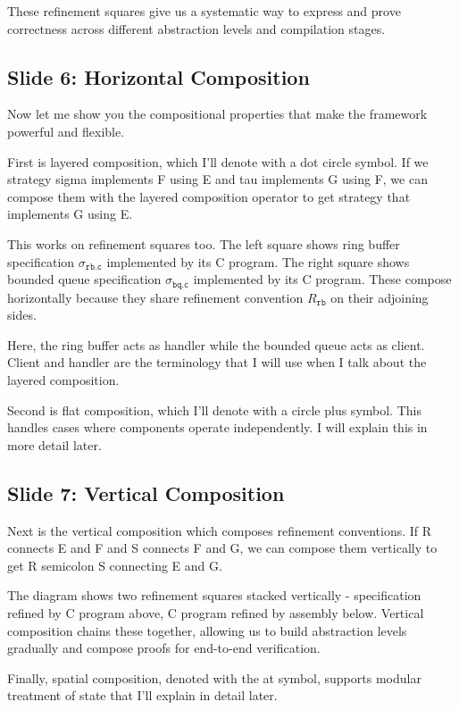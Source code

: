 \documentclass{article}
\newcommand{\kw}[1]{\ensuremath{\mathtt{#1}}}
\begin{document}
These refinement squares give us a systematic way to express and prove
correctness across different abstraction levels and compilation stages.

\subsection{Slide 6: Horizontal Composition}

Now let me show you the compositional properties that make the framework
powerful and flexible.

First is layered composition, which I'll denote with a dot circle symbol. If we
strategy sigma implements F using E and tau implements G using F, we can compose
them with the layered composition operator to get strategy that implements G
using E.

This works on refinement squares too. The left square shows ring buffer
specification $\sigma_\kw{rb.c}$ implemented by its C program. The right square
shows bounded queue specification $\sigma_\kw{bq.c}$ implemented by its C
program. These compose horizontally because they share refinement convention
$R_\kw{rb}$ on their adjoining sides.

Here, the ring buffer acts as handler while the bounded queue acts as client.
Client and handler are the terminology that I will use when I talk about the
layered composition.

Second is flat composition, which I'll denote with a circle plus symbol. This
handles cases where components operate independently. I will explain this in
more detail later.

\subsection{Slide 7: Vertical Composition}

Next is the vertical composition which composes refinement conventions. If  R
connects E and F and S connects F and G, we can compose them vertically to
get R semicolon S connecting E and G.

The diagram shows two refinement squares stacked vertically - specification
refined by C program above, C program refined by assembly below. Vertical
composition chains these together, allowing us to build abstraction levels
gradually and compose proofs for end-to-end verification.

Finally, spatial composition, denoted with the at symbol, supports modular
treatment of state that I'll explain in detail later.
\end{document}
